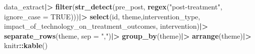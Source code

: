 \documentclass[
]{article}
\newenvironment{Shaded}{\begin{snugshade}}{\end{snugshade}}
\newcommand{\AttributeTok}[1]{\textcolor[rgb]{0.13,0.29,0.53}{#1}}
\newcommand{\ConstantTok}[1]{\textcolor[rgb]{0.56,0.35,0.01}{#1}}
\newcommand{\FunctionTok}[1]{\textcolor[rgb]{0.13,0.29,0.53}{\textbf{#1}}}
\newcommand{\NormalTok}[1]{#1}
\newcommand{\SpecialCharTok}[1]{\textcolor[rgb]{0.81,0.36,0.00}{\textbf{#1}}}
\newcommand{\StringTok}[1]{\textcolor[rgb]{0.31,0.60,0.02}{#1}}
\begin{document}
\begin{Shaded}
\begin{Highlighting}[]
\NormalTok{data\_extract}\SpecialCharTok{|\textgreater{}}
  \FunctionTok{filter}\NormalTok{(}\FunctionTok{str\_detect}\NormalTok{(pre\_post, }\FunctionTok{regex}\NormalTok{(}\StringTok{"post{-}treatment"}\NormalTok{, }\AttributeTok{ignore\_case =} \ConstantTok{TRUE}\NormalTok{)))}\SpecialCharTok{|\textgreater{}}
  \FunctionTok{select}\NormalTok{(id, theme,intervention\_type, impact\_of\_technology\_on\_treatment\_outcomes, intervention)}\SpecialCharTok{|\textgreater{}}
  \FunctionTok{separate\_rows}\NormalTok{(theme, }\AttributeTok{sep =} \StringTok{","}\NormalTok{)}\SpecialCharTok{|\textgreater{}}
  \FunctionTok{group\_by}\NormalTok{(theme)}\SpecialCharTok{|\textgreater{}}
  \FunctionTok{arrange}\NormalTok{(theme)}\SpecialCharTok{|\textgreater{}}
\NormalTok{  knitr}\SpecialCharTok{::}\FunctionTok{kable}\NormalTok{()}
\end{Highlighting}
\end{Shaded}
\end{document}
